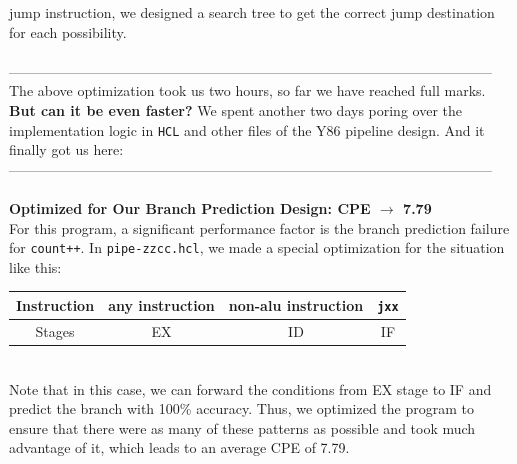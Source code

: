 \documentclass[12pt,a4paper]{article}
\begin{document}
jump instruction, we designed a search tree to get the correct jump destination for each possibility.
\\
\\
--------------------------------------------------------------------------------------------------------\\
The above optimization took us two hours, so far we have reached full marks.\\
\textbf{But can it be even faster?}
We spent another two days poring over the implementation logic in \texttt{HCL} and other files of the Y86 pipeline design. And it finally got us here:\\
--------------------------------------------------------------------------------------------------------\\
\\
{\color{red}\textbf{Optimized for Our Branch Prediction Design: CPE $\rightarrow$ 7.79}} \\
For this program, a significant performance factor is the branch prediction failure for \texttt{count++}.
In \texttt{pipe-zzcc.hcl}, we made a special optimization for the situation like this:\\
\begin{tabular}{|c|c|c|c|}
        \hline Instruction&any instruction&non-alu instruction&\texttt{jxx}\\
        \hline Stages&EX&ID&IF\\
        \hline
\end{tabular}
\\
Note that in this case, we can forward the conditions from EX stage to IF and predict the branch with 100\% accuracy. 
Thus, we optimized the program to ensure that there were as many of these patterns as 
possible and took much advantage of it, which leads to an average CPE of 7.79.
\end{document}
